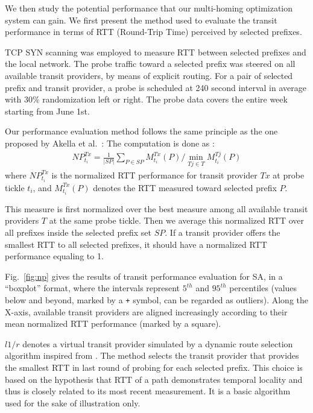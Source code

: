 \documentclass[10pt, conference,letterpaper]{IEEEtran}
\begin{document}
We then study the potential performance that our multi-homing optimization system can gain. We first present the method used to evaluate the transit performance in terms of RTT (Round-Trip Time) perceived by selected prefixes.



TCP SYN scanning was employed to measure RTT between selected prefixes and the local network.
The probe traffic toward a selected prefix was steered on all available transit providers, by means of explicit routing.
For a pair of selected prefix and transit provider, a probe is scheduled at 240 second interval in average with $30\%$ randomization left or right. 
The probe data covers the entire week starting from June 1st.



Our performance evaluation method follows the same principle as the one proposed by Akella et al.\ \cite{Akella2003a}: The computation is done as :
\begin{align}
NP^{Tx}_{t_i} = \frac{1}{|SP|} \sum_{P \in SP} M^{Tx}_{t_i}(P)/\min_{Tj \in T}M^{Tj}_{t_i}(P)
\label{eq:np}
\end{align}
where $NP^{Tx}_{t_i}$ is the normalized RTT performance for transit provider $Tx$ at probe tickle $t_i$, and 
$M^{Tx}_{t_i}(P)$ denotes the RTT measured toward selected prefix $P$.

This measure is first normalized over the best measure among all available transit providers $T$ at the same probe tickle.
Then we average this normalized RTT over all prefixes inside the selected prefix set $SP$.
If a transit provider offers the smallest RTT to all selected prefixes, it should have a normalized RTT performance equaling to 1.

Fig.~\ref{fig:np} gives the results of transit performance evaluation for SA, in a ``boxplot'' format, where the intervals represent $5^{th}$ and $95^{th}$ percentiles (values below and beyond, marked by a \texttt{+} symbol, can be regarded as outliers).
Along the X-axis, available transit providers are aligned increasingly according to their mean normalized RTT performance (marked by a square). 

$l1/r$ denotes a virtual transit provider simulated by a dynamic route selection algorithm inspired from \cite{Akella2008}. The method selects the transit provider that provides the smallest RTT in last round of probing for each selected prefix. This choice is  based on the hypothesis that RTT of a path demonstrates temporal locality and thus is  closely related to its most recent measurement.
It is a basic algorithm used for the sake of illustration only.
\end{document}
